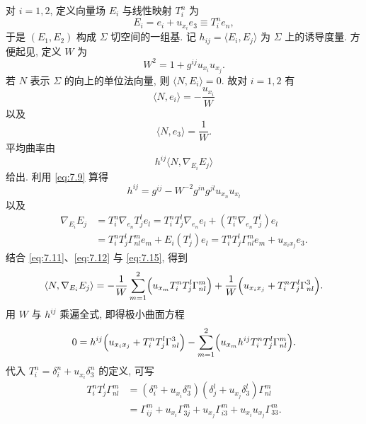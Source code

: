 对 $i=1,2$, 定义向量场 $E_i$ 与线性映射 $T_i^n$ 为
\begin{equation}
E_i=e_i+u_{x_i}e_3\equiv T_i^ne_n,
\label{eq:7.9}
\end{equation}
于是 $(E_1,E_2)$ 构成 $\Sigma$ 切空间的一组基. 记 $h_{ij}=\langle E_i,E_j\rangle$
为 $\Sigma$ 上的诱导度量. 方便起见, 定义 $W$ 为
\begin{equation}
W^2=1+g^{ij}u_{x_i}u_{x_j}.
\label{eq:7.10}
\end{equation}
若 $N$ 表示 $\Sigma$ 的向上的单位法向量, 则 $\langle N,E_i\rangle=0$. 故对
$i=1,2$ 有
\begin{equation}
\langle N,e_i\rangle=-\frac{u_{x_i}}{W}
\label{eq:7.11}
\end{equation}
以及
\begin{equation}
\langle N,e_3\rangle=\frac1W.
\label{eq:7.12}
\end{equation}
平均曲率由
\begin{equation}
h^{ij}\bigl\langle N,\nabla_{E_i}E_j\bigr\rangle
\label{eq:7.13}
\end{equation}
给出. 利用 \eqref{eq:7.9} 算得
\begin{equation}
h^{ij}=g^{ij}-W^{-2}g^{in}g^{jl}u_{x_n}u_{x_l}
\label{eq:7.14}
\end{equation}
以及
\begin{equation}
\begin{aligned}
\nabla_{E_i}E_j
&=T_i^n\nabla_{e_n}T_j^le_l
=T_i^nT_j^l\nabla_{e_n}e_l+(T_i^n\nabla_{e_n}T_j^l)e_l\\
&=T_i^nT_j^l\Gamma_{nl}^me_m+E_i(T_j^l)e_l
=T_i^nT_j^l\Gamma_{nl}^me_m+u_{x_ix_j}e_3.
\end{aligned}
\label{eq:7.15}
\end{equation}
结合 \eqref{eq:7.11}、\eqref{eq:7.12} 与 \eqref{eq:7.15}, 得到
\begin{equation}
\langle N,\nabla_{E_i}E_j\rangle
=-\frac1W\sum_{m=1}^2\Bigl(u_{x_m}T_i^nT_j^l\Gamma_{nl}^m\Bigr)
+\frac1W\Bigl(u_{x_ix_j}+T_i^nT_j^l\Gamma_{nl}^3\Bigr).
\label{eq:7.16}
\end{equation}
用 $W$ 与 $h^{ij}$ 乘遍全式, 即得极小曲面方程
\begin{equation}
0=h^{ij}\Bigl(u_{x_ix_j}+T_i^nT_j^l\Gamma_{nl}^3\Bigr)
-\sum_{m=1}^2\Bigl(u_{x_m}h^{ij}T_i^nT_j^l\Gamma_{nl}^m\Bigr).
\label{eq:7.17}
\end{equation}
代入 $T_i^n=\delta_i^n+u_{x_i}\delta_3^n$ 的定义, 可写
\begin{equation}
\begin{aligned}
T_i^nT_j^l\Gamma_{nl}^m
&=(\delta_i^n+u_{x_i}\delta_3^n)(\delta_j^l+u_{x_j}\delta_3^l)
\Gamma_{nl}^m\\
&=\Gamma_{ij}^m+u_{x_i}\Gamma_{3j}^m+u_{x_j}\Gamma_{i3}^m
+u_{x_i}u_{x_j}\Gamma_{33}^m.
\end{aligned}
\label{eq:7.18}
\end{equation}
